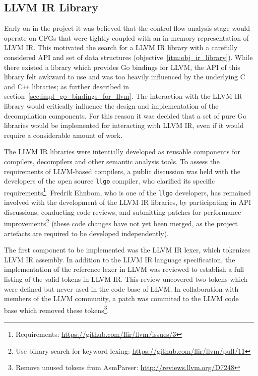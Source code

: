 
\subsection{LLVM IR Library}
\label{sec:impl_llvm_ir_library}

Early on in the project it was believed that the control flow analysis stage would operate on CFGs that were tightly coupled with an in-memory representation of LLVM IR. This motivated the search for a LLVM IR library with a carefully considered API and set of data structures (objective~\ref{itm:obj_ir_library}). While there existed a library which provides Go bindings for LLVM, the API of this library felt awkward to use and was too heavily influenced by the underlying C and C\texttt{++} libraries; as further described in section~\ref{sec:impl_go_bindings_for_llvm}. The interaction with the LLVM IR library would critically influence the design and implementation of the decompilation components. For this reason it was decided that a set of pure Go libraries would be implemented for interacting with LLVM IR, even if it would require a considerable amount of work.

The LLVM IR libraries were intentially developed as reusable components for compilers, decompilers and other semantic analysis tools. To assess the requirements of LLVM-based compilers, a public discussion was held with the developers of the open source \texttt{llgo} compiler, who clarified its specific requirements\footnote{Requirements: \url{https://github.com/llir/llvm/issues/3}}. Fredrik Ehnbom, who is one of the \texttt{llgo} developers, has remained involved with the development of the LLVM IR libraries, by participating in API discussions, conducting code reviews, and submitting patches for performance improvements\footnote{Use binary search for keyword lexing: \url{https://github.com/llir/llvm/pull/11}} (these code changes have not yet been merged, as the project artefacts are required to be developed independently).

The first component to be implemented was the LLVM IR lexer, which tokenizes LLVM IR assembly. In addition to the LLVM IR language specification, the implementation of the reference lexer in LLVM was reviewed to establish a full listing of the valid tokens in LLVM IR. This review uncovered two tokens which were defined but never used in the code base of LLVM. In collaboration with members of the LLVM community, a patch was commited to the LLVM code base which removed these tokens\footnote{Remove unused tokens from AsmParser: \url{http://reviews.llvm.org/D7248}}.

